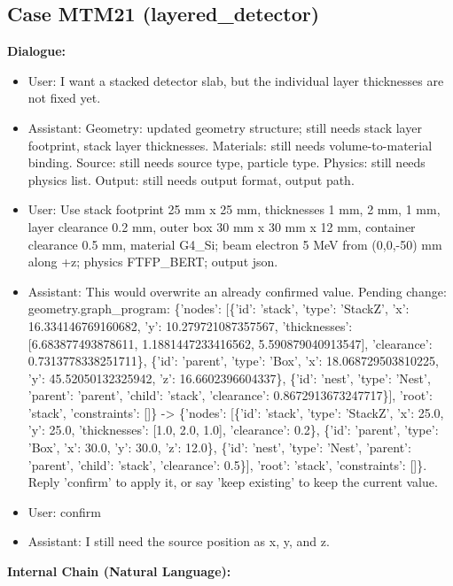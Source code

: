 \documentclass[11pt]{ctexart}
\begin{document}
\subsection{Case MTM21 (layered\_detector)}
\textbf{Dialogue:}
\begin{itemize}
\item User: I want a stacked detector slab, but the individual layer thicknesses are not fixed yet.
\item Assistant: Geometry: updated geometry structure; still needs stack layer footprint, stack layer thicknesses. Materials: still needs volume-to-material binding. Source: still needs source type, particle type. Physics: still needs physics list. Output: still needs output format, output path.
\item User: Use stack footprint 25 mm x 25 mm, thicknesses 1 mm, 2 mm, 1 mm, layer clearance 0.2 mm, outer box 30 mm x 30 mm x 12 mm, container clearance 0.5 mm, material G4\_Si; beam electron 5 MeV from (0,0,-50) mm along +z; physics FTFP\_BERT; output json.
\item Assistant: This would overwrite an already confirmed value. Pending change: geometry.graph\_program: \{'nodes': [\{'id': 'stack', 'type': 'StackZ', 'x': 16.334146769160682, 'y': 10.279721087357567, 'thicknesses': [6.683877493878611, 1.1881447233416562, 5.590879040913547], 'clearance': 0.7313778338251711\}, \{'id': 'parent', 'type': 'Box', 'x': 18.068729503810225, 'y': 45.52050132325942, 'z': 16.6602396604337\}, \{'id': 'nest', 'type': 'Nest', 'parent': 'parent', 'child': 'stack', 'clearance': 0.8672913673247717\}], 'root': 'stack', 'constraints': []\} -> \{'nodes': [\{'id': 'stack', 'type': 'StackZ', 'x': 25.0, 'y': 25.0, 'thicknesses': [1.0, 2.0, 1.0], 'clearance': 0.2\}, \{'id': 'parent', 'type': 'Box', 'x': 30.0, 'y': 30.0, 'z': 12.0\}, \{'id': 'nest', 'type': 'Nest', 'parent': 'parent', 'child': 'stack', 'clearance': 0.5\}], 'root': 'stack', 'constraints': []\}. Reply 'confirm' to apply it, or say 'keep existing' to keep the current value.
\item User: confirm
\item Assistant: I still need the source position as x, y, and z.
\end{itemize}
\textbf{Internal Chain (Natural Language):}
\end{document}
